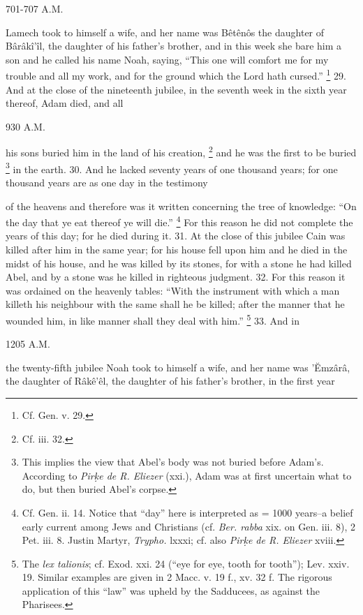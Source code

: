 701-707 A.M.

Lamech took to himself a wife, and her name was Bêtênôs the daughter of Bârâkî’îl, the daughter of his father's brother, and in this week she bare him a son and he called his name Noah, saying, ``This one will comfort me for my trouble and all my work, and for the ground which the Lord hath cursed.'' \footnote{Cf. Gen. v. 29.} 29. And at the close of the nineteenth jubilee, in the seventh week in the sixth year thereof, Adam died, and all

930 A.M.

his sons buried him in the land of his creation, \footnote{Cf. iii. 32.} and he was the first to be buried \footnote{This implies the view that Abel's body was not buried before Adam's. According to \emph{Pir\d{k}e de R. Eliezer} (xxi.), Adam was at first uncertain what to do, but then buried Abel's corpse.} in the earth. 30. And he lacked seventy years of one thousand years; for one thousand years are as one day in the testimony

of the heavens and therefore was it written concerning the tree of knowledge: ``On the day that ye eat thereof ye will die.'' \footnote{Cf. Gen. ii. 14. Notice that ``day'' here is interpreted as = 1000 years--a belief early current among Jews and Christians (cf. \emph{Ber. rabba} xix. on Gen. iii. 8), 2 Pet. iii. 8. Justin Martyr, \emph{Trypho.} lxxxi; cf. also \emph{Pir\d{k}e de R. Eliezer} xviii.} For this reason he did not complete the years of this day; for he died during it. 31. At the close of this jubilee Cain was killed after him in the same year; for his house fell upon him and he died in the midst of his house, and he was killed by its stones, for with a stone he had killed Abel, and by a stone was he killed in righteous judgment. 32. For this reason it was ordained on the heavenly tables: ``With the instrument with which a man killeth his neighbour with the same shall he be killed; after the manner that he wounded him, in like manner shall they deal with him.'' \footnote{The \emph{lex talionis}; cf. Exod. xxi. 24 (``eye for eye, tooth for tooth''); Lev. xxiv. 19. Similar examples are given in 2 Macc. v. 19 f., xv. 32 f. The rigorous application of this ``law'' was upheld by the Sadducees, as against the Pharisees.} 33. And in

1205 A.M.

the twenty-fifth jubilee Noah took to himself a wife, and her name was ’Ĕmzârâ, the daughter of Râkê’êl, the daughter of his father's brother, in the first year

